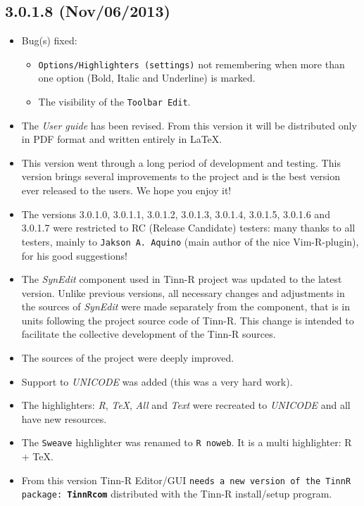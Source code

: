 \subsection{3.0.1.8 (Nov/06/2013)}
\begin{itemize}
  \item Bug(s) fixed:
    \begin{itemize}
      \item \texttt{Options/Highlighters (settings)} not remembering when more than
       one option (Bold, Italic and Underline) is marked.
      \item The visibility of the \texttt{Toolbar Edit}.
    \end{itemize}
  \item The \textit{User guide} has been revised. From this version it will be distributed
   only in PDF format and written entirely in \LaTeX.
  \item This version went through a long period of development and testing.
   This version brings several improvements to the project and is the
   best version ever released to the users. We hope you enjoy it!
  \item The versions 3.0.1.0, 3.0.1.1, 3.0.1.2, 3.0.1.3, 3.0.1.4, 3.0.1.5, 3.0.1.6 and 3.0.1.7
   were restricted to RC (Release Candidate) testers:
   many thanks to all testers, mainly to \texttt{Jakson A. Aquino} (main author of the nice Vim-R-plugin),
   for his good suggestions!
  \item The \textit{SynEdit} component used in Tinn-R project was updated to the latest version.
   Unlike previous versions, all necessary changes and adjustments in the sources of \textit{SynEdit}
   were made separately from the component, that is in units following the project source code of Tinn-R.
   This change is intended to facilitate the collective development of the Tinn-R sources.
  \item The sources of the project were deeply improved.
  \item Support to \textit{UNICODE} was added (this was a very hard work).
  \item The highlighters: \textit{R}, \textit{TeX}, \textit{All} and \textit{Text} were
   recreated to \textit{UNICODE} and all have new resources.
  \item The \texttt{Sweave} highlighter was renamed to \texttt{R noweb}. It is a multi highlighter: R + TeX.
  \item From this version Tinn-R Editor/GUI \texttt{needs a new version of the TinnR package:
   \textbf{TinnRcom}} distributed with the Tinn-R install/setup program.

\end{itemize}
